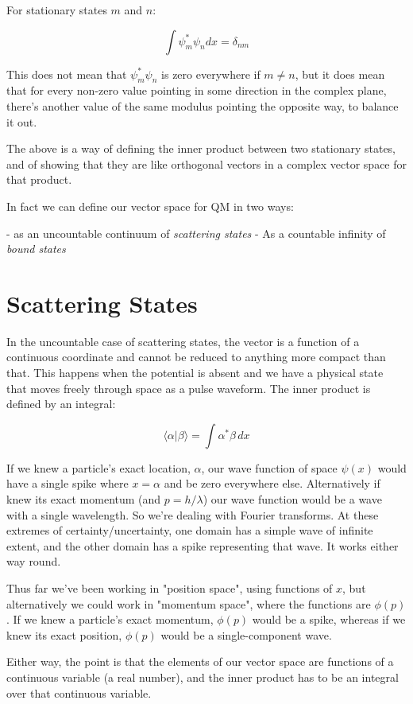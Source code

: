For stationary states $m$ and $n$:

$$
\int
\psi_m^* \psi_n dx = \delta_{nm}
$$

This does not mean that $\psi_m^* \psi_n$ is zero everywhere if $m \ne n$, but it does mean that for every non-zero value pointing in some direction in the complex plane, there's another value of the same modulus pointing the opposite way, to balance it out.

The above is a way of defining the inner product between two stationary states, and of showing that they are like orthogonal vectors in a complex vector space for that product.

In fact we can define our vector space for QM in two ways:

-   as an uncountable continuum of \textit{scattering states}
-   As a countable infinity of \textit{bound states}

\section{Scattering States}

In the uncountable case of scattering states, the vector is a function of a continuous coordinate and cannot be reduced to anything more compact than that. This happens when the potential is absent and we have a physical state that moves freely through space as a pulse waveform. The inner product is defined by an integral:

$$
\langle \alpha | \beta \rangle
=
\int
\alpha^* \beta \,dx
$$

If we knew a particle's exact location, $\alpha$, our wave function of space $\psi(x)$ would have a single spike where $x = \alpha$ and be zero everywhere else. Alternatively if knew its exact momentum (and $p=h/\lambda$) our wave function would be a wave with a single wavelength. So we're dealing with Fourier transforms. At these extremes of certainty/uncertainty, one domain has a simple wave of infinite extent, and the other domain has a spike representing that wave. It works either way round.

Thus far we've been working in "position space", using functions of $x$, but alternatively we could work in "momentum space", where the functions are $\phi(p)$. If we knew a particle's exact momentum, $\phi(p)$ would be a spike, whereas if we knew its exact position, $\phi(p)$ would be a single-component wave.

Either way, the point is that the elements of our vector space are functions of a continuous variable (a real number), and the inner product has to be an integral over that continuous variable.

